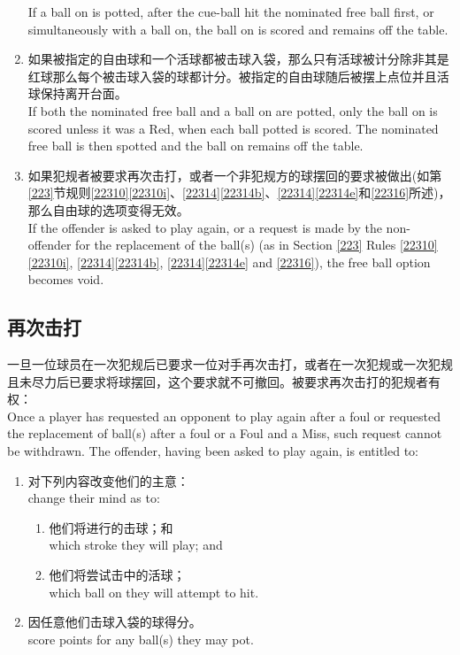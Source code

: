 \begin{enumerate}[label=(\alph*)]
    If a ball on is potted, after the cue-ball hit the nominated free ball first, or simultaneously with a ball on, the ball on is scored and remains off the table.
    \item 如果被指定的自由球和一个活球都被击球入袋，那么只有活球被计分除非其是红球那么每个被击球入袋的球都计分。被指定的自由球随后被摆上点位并且活球保持离开台面。\\
    If both the nominated free ball and a ball on are potted, only the ball on is scored unless it was a Red, when each ball potted is scored. The nominated free ball is then spotted and the ball on remains off the table.
    \item 如果犯规者被要求再次击打，或者一个非犯规方的球摆回的要求被做出(如第\ref{223}节规则\ref{22310}\ref{22310i}、\ref{22314}\ref{22314b}、\ref{22314}\ref{22314e}和\ref{22316}所述)，那么自由球的选项变得无效。\\
    If the offender is asked to play again, or a request is made by the non-offender for the replacement of the ball(s) (as in Section \ref{223} Rules \ref{22310}\ref{22310i}, \ref{22314}\ref{22314b}, \ref{22314}\ref{22314e} and \ref{22316}), the free ball option becomes void.
\end{enumerate}

\subsection{再次击打}

\noindent 一旦一位球员在一次犯规后已要求一位对手再次击打，或者在一次犯规或一次犯规且未尽力后已要求将球摆回，这个要求就不可撤回。被要求再次击打的犯规者有权：\\
Once a player has requested an opponent to play again after a foul or requested the replacement of ball(s) after a foul or a Foul and a Miss, such request cannot be withdrawn. The offender, having been asked to play again, is entitled to:
\begin{enumerate}[label=(\alph*)]
    \item 对下列内容改变他们的主意：\\
    change their mind as to:
    \begin{enumerate}[label=(\roman*)]
        \item 他们将进行的击球；和\\
        which stroke they will play; and
        \item 他们将尝试击中的活球；\\
        which ball on they will attempt to hit.
    \end{enumerate}
    \item 因任意他们击球入袋的球得分。\\
    score points for any ball(s) they may pot.
\end{enumerate}

